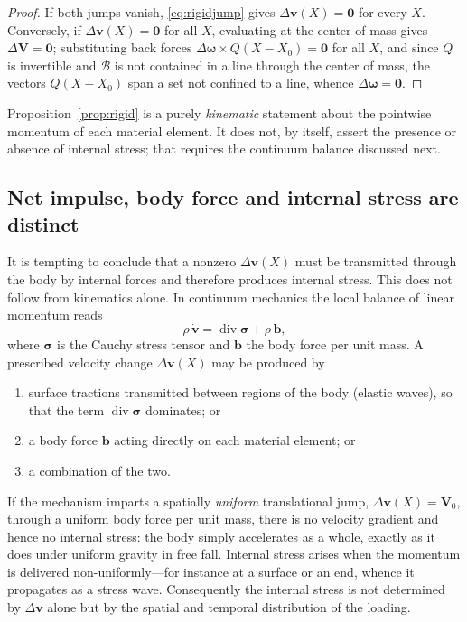 \documentclass[11pt]{article}
\begin{document}
	\begin{proof}
		If both jumps vanish, \eqref{eq:rigidjump} gives
		$\Delta\mathbf v(X)=\mathbf 0$ for every $X$. Conversely, if
		$\Delta\mathbf v(X)=\mathbf 0$ for all $X$, evaluating at the center
		of mass gives $\Delta\mathbf V=\mathbf 0$; substituting back forces
		$\Delta\boldsymbol\omega\times Q(X-X_0)=\mathbf 0$ for all $X$, and
		since $Q$ is invertible and $\mathcal B$ is not contained in a line
		through the center of mass, the vectors $Q(X-X_0)$ span a set not
		confined to a line, whence $\Delta\boldsymbol\omega=\mathbf 0$.
	\end{proof}
	
	Proposition~\ref{prop:rigid} is a purely \emph{kinematic} statement
	about the pointwise momentum of each material element. It does not, by
	itself, assert the presence or absence of internal stress; that
	requires the continuum balance discussed next.
	
	\subsection{Net impulse, body force and internal stress are distinct}
	\label{subsec:distinct}
	
	It is tempting to conclude that a nonzero $\Delta\mathbf v(X)$ must be
	transmitted through the body by internal forces and therefore produces
	internal stress. This does not follow from kinematics alone. In
	continuum mechanics the local balance of linear momentum reads
	\begin{equation}
		\rho\,\dot{\mathbf v}=\operatorname{div}\boldsymbol\sigma
		+\rho\,\mathbf b,
		\label{eq:cauchy}
	\end{equation}
	where $\boldsymbol\sigma$ is the Cauchy stress tensor and $\mathbf b$
	the body force per unit mass. A prescribed velocity change $\Delta
	\mathbf v(X)$ may be produced by
	\begin{enumerate}[label=(\alph*)]
		\item surface tractions transmitted between regions of the body
		(elastic waves), so that the term $\operatorname{div}
		\boldsymbol\sigma$ dominates; or
		\item a body force $\mathbf b$ acting directly on each material
		element; or
		\item a combination of the two.
	\end{enumerate}
	If the mechanism imparts a spatially \emph{uniform} translational jump,
	$\Delta\mathbf v(X)=\mathbf V_0$, through a uniform body force per unit
	mass, there is no velocity gradient and hence no internal stress: the
	body simply accelerates as a whole, exactly as it does under uniform
	gravity in free fall. Internal stress arises when the momentum is
	delivered non-uniformly---for instance at a surface or an end, whence it
	propagates as a stress wave. Consequently the internal stress is not
	determined by $\Delta\mathbf v$ alone but by the spatial and temporal
	distribution of the loading.
	
\end{document}

